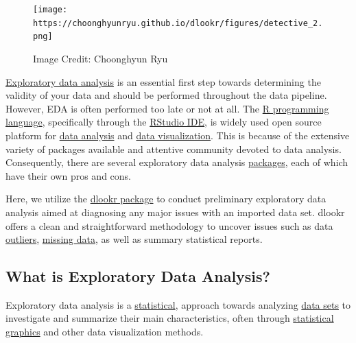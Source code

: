 \documentclass[
  letterpaper,
  DIV=11,
  numbers=noendperiod]{scrreprt}
\begin{document}
\begin{figure}

\texttt{[image: https://choonghyunryu.github.io/dlookr/figures/detective\_2.png]} \hfill{}

\caption{Image Credit: Choonghyun Ryu}

\end{figure}

\href{https://en.wikipedia.org/wiki/Exploratory_data_analysis}{Exploratory
data analysis} is an essential first step towards determining the
validity of your data and should be performed throughout the data
pipeline. However, EDA is often performed too late or not at all. The
\href{https://en.wikipedia.org/wiki/R_(programming_language)}{R
programming language}, specifically through the
\href{https://en.wikipedia.org/wiki/RStudio}{RStudio IDE}, is widely
used open source platform for
\href{https://en.wikipedia.org/wiki/Data_analysis}{data analysis} and
\href{https://en.wikipedia.org/wiki/Data_and_information_visualization}{data
visualization}. This is because of the extensive variety of packages
available and attentive community devoted to data analysis.
Consequently, there are several exploratory data analysis
\href{https://arxiv.org/pdf/1904.02101.pdf}{packages}, each of which
have their own pros and cons.

Here, we utilize the
\href{https://github.com/choonghyunryu/dlookr}{dlookr package} to
conduct preliminary exploratory data analysis aimed at diagnosing any
major issues with an imported data set. dlookr offers a clean and
straightforward methodology to uncover issues such as data
\href{https://en.wikipedia.org/wiki/Outlier}{outliers},
\href{https://en.wikipedia.org/wiki/Missing_data}{missing data}, as well
as summary statistical reports.

\hypertarget{what-is-exploratory-data-analysis}{%
\subsection{What is Exploratory Data
Analysis?}\label{what-is-exploratory-data-analysis}}

Exploratory data analysis is a
\href{https://en.wikipedia.org/wiki/Statistics}{statistical}, approach
towards analyzing \href{https://en.wikipedia.org/wiki/Data_set}{data
sets} to investigate and summarize their main characteristics, often
through
\href{https://en.wikipedia.org/wiki/Statistical_graphics}{statistical
graphics} and other data visualization methods.
\end{document}
